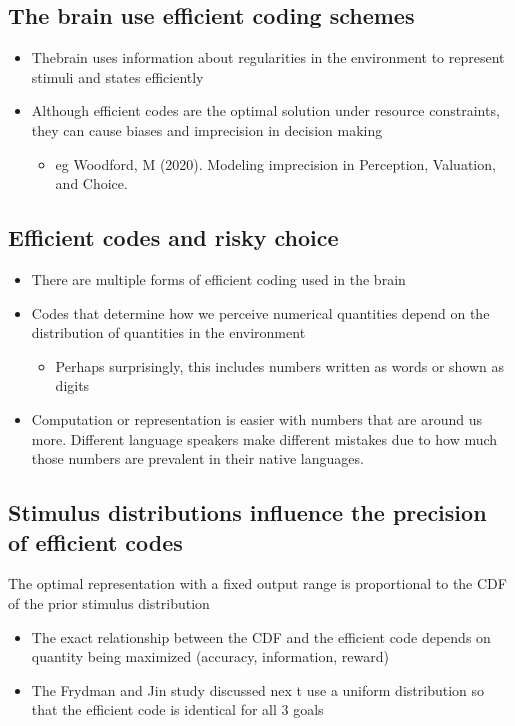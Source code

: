 \subsection{The brain use efficient coding schemes}
\begin{itemize}
    \item Thebrain uses information about regularities in the environment to represent stimuli and states efficiently
    \item Although efficient codes are the optimal solution under resource constraints,
    they can cause biases and imprecision in  decision making
    \begin{itemize}
        \item eg Woodford, M (2020). Modeling imprecision in Perception, Valuation, and Choice.
    \end{itemize}
\end{itemize}
\subsection{Efficient codes and risky choice}
\begin{itemize}
    \item There are multiple forms of efficient coding used in the brain
    \item Codes that determine how we perceive numerical quantities depend on the distribution of quantities in the environment
    \begin{itemize}
        \item Perhaps surprisingly, this includes numbers written as words or shown as digits
    \end{itemize}
    \item Computation or representation is easier with numbers that are around us more. Different language speakers make different mistakes due to how much those numbers are prevalent in their native languages.
\end{itemize}
\subsection{Stimulus distributions influence the precision of efficient codes}
The optimal representation with a fixed output range is proportional to the CDF of the prior stimulus distribution
\begin{itemize}
    \item The exact relationship between  the CDF and the efficient code depends on quantity being maximized (accuracy, information, reward)
    \item The Frydman and Jin study discussed nex t use a uniform distribution so that the efficient code is identical for all 3 goals
\end{itemize}
